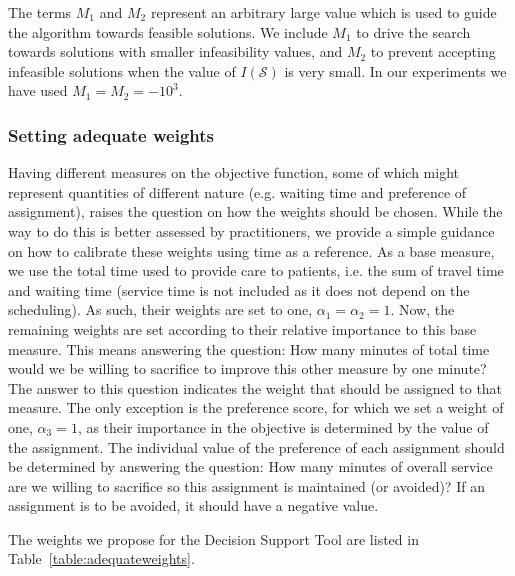 \documentclass[a4paper,11pt,authoryear]{elsarticle}
\begin{document}
The terms $M_1$ and $M_2$ represent an arbitrary large value which is used to guide the algorithm towards feasible solutions. We include $M_1$ to drive the search towards solutions with smaller infeasibility values, and $M_2$ to prevent accepting infeasible solutions when the value of $I(\mathcal{S})$ is very small. In our experiments we have used $M_1 = M_2 = -10^3$.

\subsubsection{Setting adequate weights}
\label{subsub:adequateweights}
\noindent Having different measures on the objective function, some of which might represent quantities of different nature (e.g. waiting time and preference of assignment), raises the question on how the weights should be chosen. While the way to do this is better assessed by practitioners, we provide a simple guidance on how to calibrate these weights using time as a reference.
As a base measure, we use the total time used to provide care to patients, i.e. the sum of travel time and waiting time (service time is not included as it does not depend on the scheduling). As such, their weights are set to one, $\alpha_1 = \alpha_2 = 1$.
Now, the remaining weights are set according to their relative importance to this base measure. This means answering the question: How many minutes of total time would we be willing to sacrifice to improve this other measure by one minute? The answer to this question indicates the weight that should be assigned to that measure.
The only exception is the preference score, for which we set a weight of one, $\alpha_3 = 1$, as their importance in the objective is determined by the value of the assignment. The individual value of the preference of each assignment should be determined by answering the question: How many minutes of overall service are we willing to sacrifice so this assignment is maintained (or avoided)? If an assignment is to be avoided, it should have a negative value.

The weights we propose for the Decision Support Tool are listed in Table~\ref{table:adequateweights}.
\end{document}
